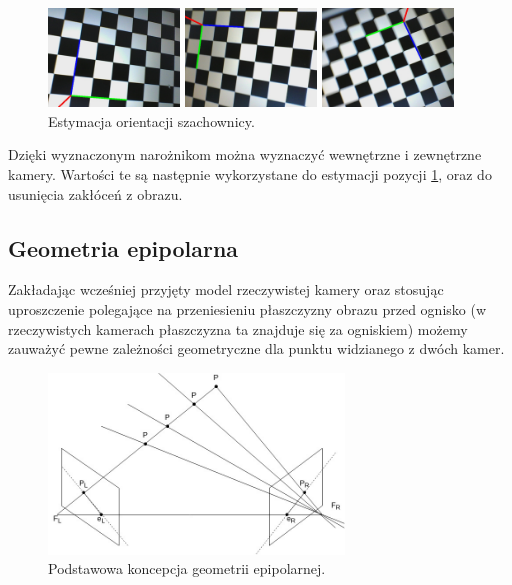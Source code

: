 \documentclass[oneside, eng]{mgr}
\begin{document}
\begin{figure}
\centering
		\begin{minipage}{3.5cm}
			\includegraphics[width=3.5cm]{left8.jpg}
		\end{minipage}
		\begin{minipage}{3.5cm}
			\includegraphics[width=3.5cm]{left17.jpg}
		\end{minipage}
		\begin{minipage}{3.5cm}
			\includegraphics[width=3.5cm]{left24.jpg}
		\end{minipage}
	\caption{Estymacja orientacji szachownicy. }
	\label{fig:pose}
\end{figure}

Dzięki wyznaczonym narożnikom można wyznaczyć wewnętrzne i zewnętrzne kamery. Wartości te są następnie wykorzystane do estymacji pozycji \ref{fig:pose}, oraz do usunięcia zakłóceń z obrazu. 

\subsection{Geometria epipolarna}

Zakładając wcześniej przyjęty model rzeczywistej kamery oraz stosując uproszczenie polegające na przeniesieniu płaszczyzny obrazu przed ognisko (w rzeczywistych kamerach płaszczyzna ta znajduje się za ogniskiem) możemy zauważyć pewne zależności geometryczne dla punktu widzianego z dwóch kamer. 

\begin{figure}
\centering
	\includegraphics[width=0.70\textwidth]{epipolar.jpg}\par\vspace{1cm}
\caption{Podstawowa koncepcja geometrii epipolarnej.}
	\label{fig:gradient}
\end{figure}
\end{document}

